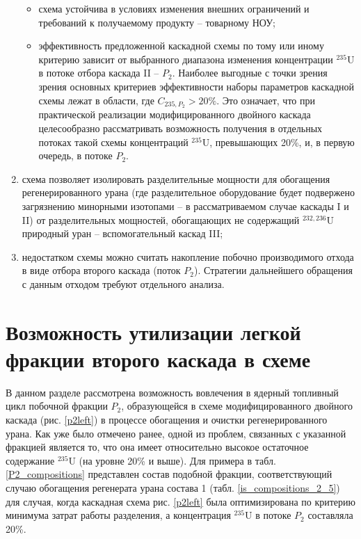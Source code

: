 \begin{enumerate}
\begin{itemize}
        \item схема устойчива в условиях изменения внешних ограничений и требований к получаемому продукту -- товарному НОУ;
        \item эффективность предложенной каскадной схемы по тому или иному критерию зависит от выбранного диапазона изменения концентрации $^{235}$U в потоке отбора каскада II -- $P_2$. Наиболее выгодные с точки зрения зрения основных критериев эффективности наборы параметров каскадной схемы лежат в области, где $C_{235,{P_2}} > 20\%$. Это означает, что при практической реализации модифицированного двойного каскада целесообразно рассматривать возможность получения в отдельных потоках такой схемы концентраций $^{235}$U, превышающих 20\%, и, в первую очередь, в потоке $P_2$.
    \end{itemize}       
    \item схема позволяет изолировать разделительные мощности для обогащения регенерированного урана (где разделительное оборудование будет подвержено загрязнению минорными изотопами -- в рассматриваемом случае каскады I и II) от разделительных мощностей, обогащающих не содержащий $^{232,236}$U природный уран -- вспомогательный каскад III;
    \item недостатком схемы можно считать накопление побочно производимого отхода в виде отбора второго каскада (поток $P_2$). Стратегии дальнейшего обращения с данным отходом требуют отдельного анализа.
\end{enumerate}


\section{Возможность утилизации легкой фракции второго каскада в схеме}

В данном разделе рассмотрена возможность вовлечения в ядерный топливный цикл побочной фракции $P_2$, образующейся в схеме модифицированного двойного каскада (рис. \ref{p2left}) в процессе обогащения и очистки регенерированного урана. Как уже было отмечено ранее, одной из проблем, связанных с указанной фракцией является то, что она имеет относительно высокое остаточное содержание $^{235}$U (на уровне 20\% и выше). Для примера в табл. \ref{P2_compositions} представлен состав подобной фракции, соответствующий случаю обогащения регенерата урана состава 1 (табл. \ref{is_compositions_2_5}) для случая, когда каскадная схема рис. \ref{p2left} была оптимизирована по критерию минимума затрат работы разделения, а концентрация $^{235}$U в потоке $P_2$ составляла 20\%. 


